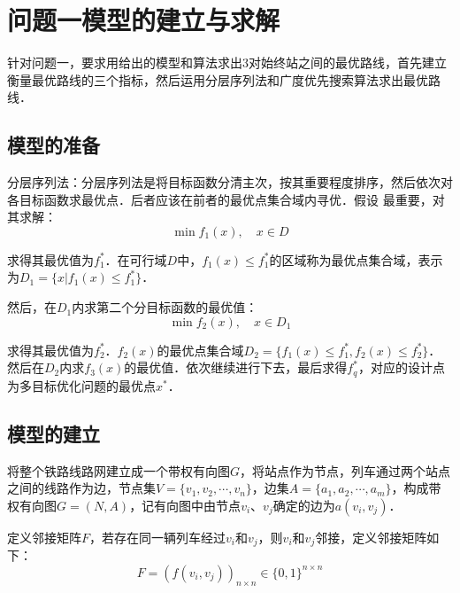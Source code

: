 \documentclass[UTF8]{ctexart}
\begin{document}
\section{问题一模型的建立与求解}
针对问题一，要求用给出的模型和算法求出3对始终站之间的最优路线，首先建立衡量最优路线的三个指标，然后运用分层序列法和广度优先搜索算法求出最优路线．

\subsection{模型的准备}
分层序列法：分层序列法是将目标函数分清主次，按其重要程度排序，然后依次对各目标函数求最优点．后者应该在前者的最优点集合域内寻优．假设 最重要，对其求解：
$$\min f_1(x), \quad x \in D$$

求得其最优值为$f_1^*$．在可行域$D$中，$f_1(x) \leq f_1^*$的区域称为最优点集合域，表示为$D_1 = \{x|f_1(x) \leq f_1^*\}$．

然后，在$D_1$内求第二个分目标函数的最优值：
$$\min f_2(x), \quad x \in D_1$$

求得其最优值为$f_2^*$．$f_2(x)$的最优点集合域$D_2 = \{f_1(x)\leq f_1^*, f_2(x)\leq f_2^*\}$． 然后在$D_2$内求$f_3(x)$的最优值．依次继续进行下去，最后求得$f_q^*$，对应的设计点为多目标优化问题的最优点$x^*$．

\subsection{模型的建立}
将整个铁路线路网建立成一个带权有向图$G$，将站点作为节点，列车通过两个站点之间的线路作为边，节点集$V = \{v_1,v_2,\cdots,v_n\}$，边集$A = \{a_1,a_2,\cdots,a_m\}$，构成带权有向图$G = (N,A)$，记有向图中由节点$v_i$、$v_j$确定的边为$a(v_i,v_j)$．

定义邻接矩阵$F$，若存在同一辆列车经过$v_i$和$v_j$，则$v_i$和$v_j$邻接，定义邻接矩阵如下：
$$F = (f(v_i,v_j))_{n\times n} \in \{0,1\}^{n \times n}$$
\end{document}
